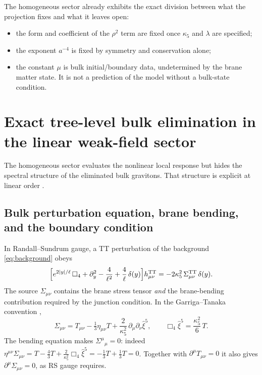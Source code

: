 \documentclass[11pt,a4paper]{article}
\theoremstyle{plain}
\theoremstyle{definition}
\newcommand{\kfive}{\kappa_5}
\newcommand{\TT}{\mathrm{TT}}
\begin{document}
The homogeneous sector already exhibits the exact division between what
the projection fixes and what it leaves open:
\begin{itemize}[leftmargin=*]
\item the form and coefficient of the $\rho^2$ term are fixed once
$\kfive$ and $\lambda$ are specified;
\item the exponent $a^{-4}$ is fixed by symmetry and conservation alone;
\item the constant $\mu$ is bulk initial/boundary data, undetermined by
the brane matter state. It is not a prediction of the model without a
bulk-state condition.
\end{itemize}

\section{Exact tree-level bulk elimination in the linear weak-field sector}
\label{sec:linear}

The homogeneous sector evaluates the nonlinear local response but hides
the spectral structure of the eliminated bulk gravitons. That structure
is explicit at linear order \cite{RS2,GarrigaTanaka,GKR}.

\subsection{Bulk perturbation equation, brane bending, and the boundary condition}
\label{sec:bending}

In Randall--Sundrum gauge, a TT perturbation of the background
\eqref{eq:background} obeys
\begin{equation}
\label{eq:bulkwave}
\Bigl[
e^{2|y|/\ell}\,\Box_4
+\partial_y^2-\frac{4}{\ell^2}
+\frac{4}{\ell}\,\delta(y)
\Bigr]h^{\TT}_{\mu\nu}
=-2\kfive^2\,\Sigma^{\TT}_{\mu\nu}\,\delta(y).
\end{equation}
The source $\Sigma_{\mu\nu}$ contains the brane stress tensor
\emph{and} the brane-bending contribution required by the junction
condition. In the Garriga--Tanaka convention \cite{GarrigaTanaka},
\begin{equation}
\label{eq:bending}
\boxed{\;
\Sigma_{\mu\nu}
=T_{\mu\nu}-\tfrac13\eta_{\mu\nu}T
+\frac{2}{\kfive^2}\,\partial_\mu\partial_\nu\hat\xi^5,
\qquad
\Box_4\hat\xi^5=\frac{\kfive^2}{6}\,T .
\;}
\end{equation}
The bending equation makes $\Sigma^\mu{}_\mu=0$: indeed
$\eta^{\mu\nu}\Sigma_{\mu\nu}
=T-\tfrac43T+\tfrac{2}{\kfive^2}\Box_4\hat\xi^5
=-\tfrac13T+\tfrac13T=0$.
Together with $\partial^\mu T_{\mu\nu}=0$ it also gives
$\partial^\mu\Sigma_{\mu\nu}=0$, as RS gauge requires.
\end{document}
